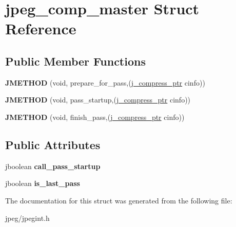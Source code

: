 \hypertarget{structjpeg__comp__master}{}\section{jpeg\+\_\+comp\+\_\+master Struct Reference}
\label{structjpeg__comp__master}
\subsection*{Public Member Functions}
\begin{DoxyCompactItemize}
\item 
{\bfseries J\+M\+E\+T\+H\+OD} (void, prepare\+\_\+for\+\_\+pass,(\hyperlink{structjpeg__compress__struct}{j\+\_\+compress\+\_\+ptr} cinfo))\hypertarget{structjpeg__comp__master_afdbee5aedaedd9c6c9837b6bfd834a63}{}\label{structjpeg__comp__master_afdbee5aedaedd9c6c9837b6bfd834a63}

\item 
{\bfseries J\+M\+E\+T\+H\+OD} (void, pass\+\_\+startup,(\hyperlink{structjpeg__compress__struct}{j\+\_\+compress\+\_\+ptr} cinfo))\hypertarget{structjpeg__comp__master_ac7e4391d1afe92c685cb4ffea5383d2c}{}\label{structjpeg__comp__master_ac7e4391d1afe92c685cb4ffea5383d2c}

\item 
{\bfseries J\+M\+E\+T\+H\+OD} (void, finish\+\_\+pass,(\hyperlink{structjpeg__compress__struct}{j\+\_\+compress\+\_\+ptr} cinfo))\hypertarget{structjpeg__comp__master_a81648a22581acb403aa707a5e56bf993}{}\label{structjpeg__comp__master_a81648a22581acb403aa707a5e56bf993}

\end{DoxyCompactItemize}
\subsection*{Public Attributes}
\begin{DoxyCompactItemize}
\item 
jboolean {\bfseries call\+\_\+pass\+\_\+startup}\hypertarget{structjpeg__comp__master_ae484ddb9a36971b2a05ff7d52e03cb38}{}\label{structjpeg__comp__master_ae484ddb9a36971b2a05ff7d52e03cb38}

\item 
jboolean {\bfseries is\+\_\+last\+\_\+pass}\hypertarget{structjpeg__comp__master_ae1ab71c8d98999e8e2489d71b113522e}{}\label{structjpeg__comp__master_ae1ab71c8d98999e8e2489d71b113522e}

\end{DoxyCompactItemize}


The documentation for this struct was generated from the following file\+:\begin{DoxyCompactItemize}
\item 
jpeg/jpegint.\+h\end{DoxyCompactItemize}
